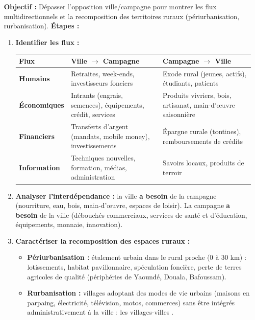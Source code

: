 \documentclass[11pt]{article}
\begin{document}
\begin{methode}
\textbf{Objectif :} Dépasser l'opposition ville/campagne pour montrer les flux multidirectionnels et la recomposition des territoires ruraux (périurbanisation, rurbanisation).
\textbf{Étapes :}
\begin{enumerate}
    \item \textbf{Identifier les flux :}
    \begin{center}
    \begin{tabularx}{\linewidth}{|l|X|X|}\hline
    \textbf{Flux} & \textbf{Ville $\rightarrow$ Campagne} & \textbf{Campagne $\rightarrow$ Ville} \\ \hline
    \textbf{Humains} & Retraites, week-ends, investisseurs fonciers & Exode rural (jeunes, actifs), étudiants, patients \\ \hline
    \textbf{Économiques} & Intrants (engrais, semences), équipements, crédit, services & Produits vivriers, bois, artisanat, main-d'œuvre saisonnière \\ \hline
    \textbf{Financiers} & Transferts d'argent (mandats, mobile money), investissements & Épargne rurale (tontines), remboursements de crédits \\ \hline
    \textbf{Information} & Techniques nouvelles, formation, médias, administration & Savoirs locaux, produits de terroir \\ \hline
    \end{tabularx}
    \end{center}
    \item \textbf{Analyser l'interdépendance :} la ville \textbf{a besoin} de la campagne (nourriture, eau, bois, main-d'œuvre, espaces de loisir). La campagne \textbf{a besoin} de la ville (débouchés commerciaux, services de santé et d'éducation, équipements, monnaie, innovation).
    \item \textbf{Caractériser la recomposition des espaces ruraux :}
    \begin{itemize}
        \item \textbf{Périurbanisation :} étalement urbain dans le rural proche (0 à 30 km) : lotissements, habitat pavillonnaire, spéculation foncière, perte de terres agricoles de qualité (périphéries de Yaoundé, Douala, Bafoussam).
        \item \textbf{Rurbanisation :} villages adoptant des modes de vie urbains (maisons en parpaing, électricité, télévision, motos, commerces) sans être intégrés administrativement à la ville : les \og villages-villes \fg{}.

\end{itemize}
\end{enumerate}
\end{methode}
\end{document}
